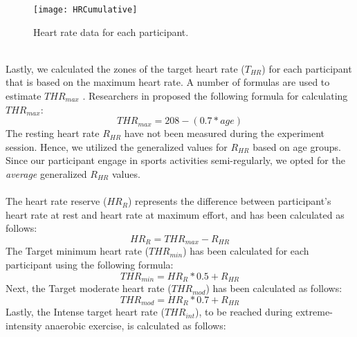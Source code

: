 \begin{figure}[h]
    \centering
    \texttt{[image: HRCumulative]}
    \caption{Heart rate data for each participant.}
    \label{fig:hrCumulative}
\end{figure}\\
Lastly, we calculated the zones of the target heart rate (\begin{math} T_{HR}\end{math}) for each participant that is based on the maximum heart rate. A number of formulas are used to estimate  \begin{math} THR_{max}\end{math} \cite{heartRate}. Researchers in \cite{tanaka2001age} proposed the following formula for calculating \begin{math}THR_{max}\end{math}:\\
\begin{equation}
THR_{max} = 208-(0.7 * age)
\end{equation}The resting heart rate \begin{math} R_{HR}\end{math} have not been measured during the experiment session. Hence, we utilized the generalized values for \begin{math} R_{HR}\end{math} based on age groups. Since our participant engage in sports activities semi-regularly, we opted for the \textit{average} generalized \begin{math} R_{HR}\end{math} values. \\\\The heart rate reserve (\begin{math} HR_{R}\end{math}) represents the difference between participant's heart rate at rest and heart rate at maximum effort, and has been calculated as follows: \begin{equation}
HR_{R} = THR_{max} - R_{HR} 
\end{equation}The Target minimum heart rate (\begin{math} THR_{min}\end{math}) has been calculated for each participant using the following formula:\begin{equation}
THR_{min} =  HR_{R}*0.5 + R_{HR} 
\end{equation}
Next, the Target moderate heart rate (\begin{math} THR_{mod}\end{math}) has been calculated as follows:\begin{equation}
THR_{mod} =  HR_{R}*0.7 + R_{HR} 
\end{equation}Lastly, the Intense target heart rate (\begin{math} THR_{int}\end{math}), to be reached during extreme-intensity anaerobic exercise, is calculated as follows: 
